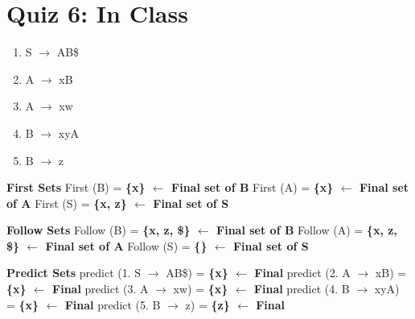 \documentclass{report}
\begin{document}
\section{Quiz 6: In Class}
\vspace{-1em}
\begin{multicols}{2}
      \begin{enumerate}[label=\arabic*.]
        \item S $\rightarrow$ AB\$
        \item A $\rightarrow$ xB
        \item A $\rightarrow$ xw
        \item B $\rightarrow$ xyA
        \item B $\rightarrow$ z
      \end{enumerate}
\setlength{\leftskip}{-12em}
      \textbf{First Sets}\newline
      First (B) = \textbf{\{x\} $\leftarrow$ Final set of B}\newline
      First (A) = \textbf{\{x\} $\leftarrow$ Final set of A}\newline
      First (S) = \textbf{\{x, z\} $\leftarrow$ Final set of S}\newline
\end{multicols}
\begin{multicols}{2}
\noindent\textbf{Follow Sets}\newline
    Follow (B) = \textbf{ \{x, z, \$\} $\leftarrow$ Final set of B}\newline
    Follow (A) = \textbf{ \{x, z, \$\} $\leftarrow$ Final set of A}\newline
    Follow (S) =  \textbf{ \{\} $\leftarrow$ Final set of S}\newline\newline\newline

\noindent\textbf{Predict Sets}\newline
    predict (1. S $\rightarrow$ AB\$) = \textbf{ \{x\} $\leftarrow$ Final}\newline
    predict (2. A $\rightarrow$ xB) = \textbf{ \{x\} $\leftarrow$ Final}\newline
    predict (3. A $\rightarrow$ xw) = \textbf{ \{x\} $\leftarrow$ Final}\newline
    predict (4. B $\rightarrow$ xyA) = \textbf{ \{x\} $\leftarrow$ Final}\newline
    predict (5. B $\rightarrow$ z) = \textbf{ \{z\} $\leftarrow$ Final}\newline
\end{multicols}
\end{document}

